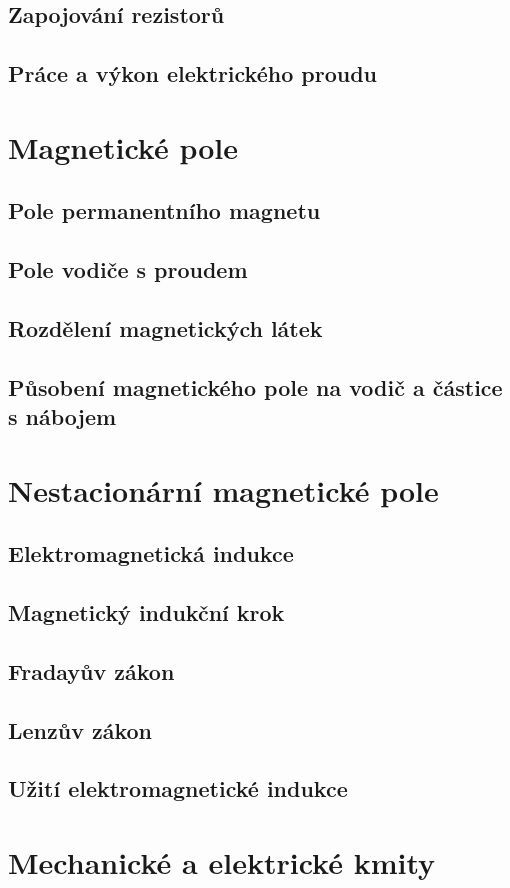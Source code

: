 \documentclass[titlepage]{book}
\begin{document}
\section{Zapojování rezistorů}
\section{Práce a výkon elektrického proudu}
\chapter{Magnetické pole}
\section{Pole permanentního magnetu}
\section{Pole vodiče s proudem}
\section{Rozdělení magnetických látek}
\section{Působení magnetického pole na vodič a částice s nábojem}
\chapter{Nestacionární magnetické pole}
\section{Elektromagnetická indukce}
\section{Magnetický indukční krok}
\section{Fradayův zákon}
\section{Lenzův zákon}
\section{Užití elektromagnetické indukce}
\chapter{Mechanické a elektrické kmity}
\end{document}
